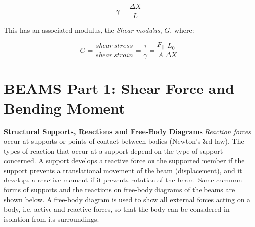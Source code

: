 \documentclass[12pt, letterpaper, twoside]{article}
\begin{document}
\begin{equation}
\gamma = \frac{\Delta X}{L}
\end{equation} 

\bigskip


\begin{center}
\end{center}

\bigskip

This has an associated modulus, the \emph{ Shear modulus}, $G$, where:

\begin{equation}
G = \frac{shear \ stress}{shear \ strain} = \frac{\tau}{\gamma} =  \frac{F_\parallel}{A} \frac{L_0}{\Delta X}
\end{equation}
$$   $$


\newpage


\section{BEAMS Part 1: Shear Force and Bending Moment}

\textbf{Structural Supports, Reactions and Free-Body Diagrams}
\emph{Reaction forces} occur at supports or points of contact between bodies (Newton's 3rd law). The types of reaction that occur at a support depend on the type of support concerned. A support develops a reactive force on the supported member if the support prevents a translational movement of the beam (displacement), and it develops a reactive moment if it prevents rotation of the beam. Some common forms of supports and the reactions on free-body diagrams of the beams are shown below. A free-body diagram is used to show all external forces acting on a body, i.e. active and reactive forces, so that the body can be considered in isolation from its surroundings.
\end{document}

